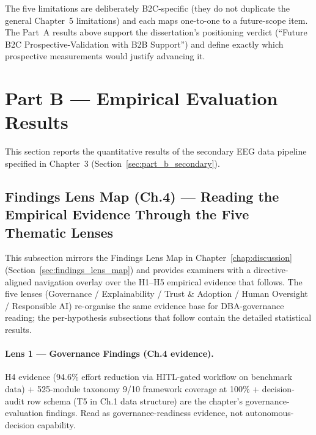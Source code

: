 \noindent The five limitations are deliberately B2C-specific (they do not duplicate the general Chapter~5 limitations) and each maps one-to-one to a future-scope item. The Part~A results above support the dissertation's positioning verdict (``Future B2C Prospective-Validation with B2B Support'') and define exactly which prospective measurements would justify advancing it.


\section{Part B --- Empirical Evaluation Results}
\label{sec:ch4_part_b}

This section reports the quantitative results of the secondary EEG data pipeline specified in Chapter~3 (Section~\ref{sec:part_b_secondary}).

\subsection{Findings Lens Map (Ch.4) --- Reading the Empirical Evidence Through the Five Thematic Lenses}
\label{sec:ch4_findings_lens_map}

This subsection mirrors the Findings Lens Map in Chapter~\ref{chap:discussion} (Section~\ref{sec:findings_lens_map}) and provides examiners with a directive-aligned navigation overlay over the H1--H5 empirical evidence that follows. The five lenses (Governance / Explainability / Trust \& Adoption / Human Oversight / Responsible AI) re-organise the same evidence base for DBA-governance reading; the per-hypothesis subsections that follow contain the detailed statistical results.

\paragraph{Lens 1 --- Governance Findings (Ch.4 evidence).}
H4 evidence (94.6\% effort reduction via HITL-gated workflow on benchmark data) + 525-module taxonomy 9/10 framework coverage at 100\% + decision-audit row schema (T5 in Ch.1 data structure) are the chapter's governance-evaluation findings. Read as governance-readiness evidence, not autonomous-decision capability.

